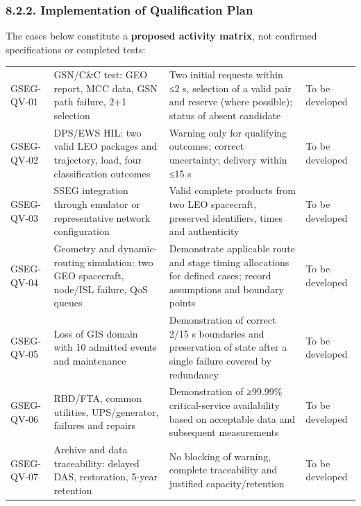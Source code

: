 \subsubsection{8.2.2. Implementation of Qualification Plan}\label{ddjf-8-2-2}

The cases below constitute a \textbf{proposed activity matrix}, not confirmed specifications or completed tests:

\begingroup{}
\begin{longtable}{|P{0.14}|P{0.33}|P{0.33}|P{0.20}|}
\hline{}
 &  &  & \\ \hline
\endhead
\hline\endlastfoot
GSEG-QV-01 & GSN/\allowbreak{}C\&C test: GEO report, MCC data, GSN path failure, 2+1 selection & Two initial requests within ≤2 s, selection of a valid pair and reserve (where possible); status of absent candidate & To be developed\\ \hline
GSEG-QV-02 & DPS/\allowbreak{}EWS HIL: two valid LEO packages and trajectory, load, four classification outcomes & Warning only for qualifying outcomes; correct uncertainty; delivery within ≤15 s & To be developed\\ \hline
GSEG-QV-03 & SSEG integration through emulator or representative network configuration & Valid complete products from two LEO spacecraft, preserved identifiers, times and authenticity & To be developed\\ \hline
GSEG-QV-04 & Geometry and dynamic-routing simulation: two GEO spacecraft, node/\allowbreak{}ISL failure, QoS queues & Demonstrate applicable route and stage timing allocations for defined cases; record assumptions and boundary points & To be developed\\ \hline
GSEG-QV-05 & Loss of GIS domain with 10 admitted events and maintenance & Demonstration of correct 2/\allowbreak{}15 s boundaries and preservation of state after a single failure covered by redundancy & To be developed\\ \hline
GSEG-QV-06 & RBD/\allowbreak{}FTA, common utilities, UPS/\allowbreak{}generator, failures and repairs & Demonstration of ≥99.99\% critical-service availability based on acceptable data and subsequent measurements & To be developed\\ \hline
GSEG-QV-07 & Archive and data traceability: delayed DAS, restoration, 5-year retention & No blocking of warning, complete traceability and justified capacity/\allowbreak{}retention & To be developed\\ \hline

\end{longtable}
